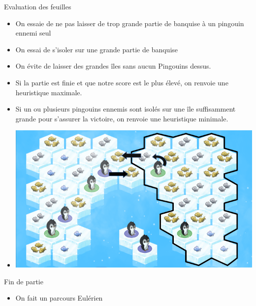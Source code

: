 \documentclass{beamer}
\begin{document}
\begin{frame}{}
\begin{block}{Evaluation des feuilles}
\begin{itemize}
 \item<1-> On essaie de ne pas laisser de trop grande partie de banquise à un pingouin ennemi seul
 \item<2-> On essai de s'isoler sur une grande partie de banquise
 \item<3-> On évite de laisser des grandes îles sans aucun Pingouins dessus.
 \item<4-> Si la partie est finie et que notre score est le plus élevé, on renvoie 
une heuristique maximale.
 \item<5-> Si un ou plusieurs pingouins ennemis sont isolés sur une île suffisamment grande pour s'assurer la victoire, on renvoie une heuristique minimale.
\end{itemize}
\end{block}
\end{frame}

\begin{frame}{}
\begin{block}{}
\begin{itemize}
 \item{ \includegraphics[scale=0.4]{IA9}}
\end{itemize}
\end{block}
\end{frame}

\begin{frame}{}
\begin{block}{Fin de partie}
\begin{itemize}
  \item{On fait un parcours Eulérien}
\end{itemize}
\end{block}
\end{frame}
\end{document}
